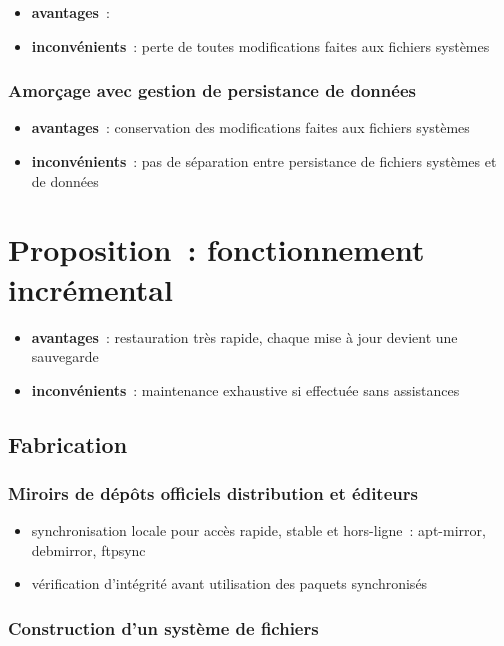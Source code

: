 \documentclass[10pt]{article}
\newenvironment{itmz}{\begin{itemize}
\setlength{\itemsep}{0em}
}{\end{itemize}}
\begin{document}
\begin{itmz}
\item{\textbf{avantages} :}
\item{\textbf{inconvénients} : perte de toutes modifications faites aux fichiers systèmes}
\end{itmz}

\subsubsection{Amorçage avec gestion de persistance de données}

\begin{itmz}
\item{\textbf{avantages} : conservation des modifications faites aux fichiers systèmes}
\item{\textbf{inconvénients} : pas de séparation entre persistance de fichiers systèmes et de données}
\end{itmz}

\section{Proposition : fonctionnement incrémental}

\begin{itmz}
\item{\textbf{avantages} : restauration très rapide, chaque mise à jour devient une sauvegarde}
\item{\textbf{inconvénients} : maintenance exhaustive si effectuée sans assistances}
\end{itmz}

\subsection{Fabrication}

\subsubsection{Miroirs de dépôts officiels distribution et éditeurs}

\begin{itmz}
\item{synchronisation locale pour accès rapide, stable et hors-ligne : apt-mirror, debmirror, ftpsync}
\item{vérification d’intégrité avant utilisation des paquets synchronisés}
\end{itmz}

\subsubsection{Construction d’un système de fichiers}
\end{document}
